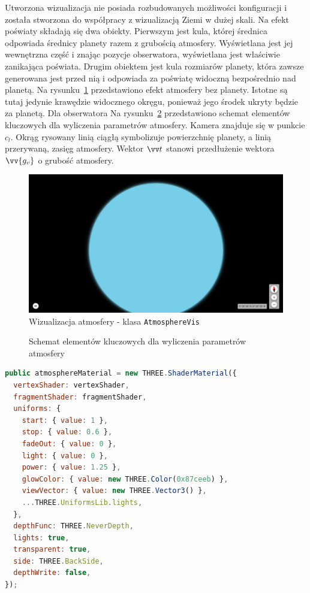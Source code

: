 Utworzona wizualizacja nie posiada rozbudowanych możliwości konfiguracji i została stworzona do współpracy z wizualizacją Ziemi w dużej skali. Na efekt poświaty składają się dwa obiekty. Pierwszym jest kula, której średnica odpowiada średnicy planety razem z grubością atmosfery. Wyświetlana jest jej wewnętrzna część i znając pozycje obserwatora, wyświetlana jest właściwie zanikająca poświata. Drugim obiektem jest kula rozmiarów planety, która zawsze generowana jest przed nią i odpowiada za poświatę widoczną bezpośrednio nad planetą. Na rysunku~\ref{fig:c4_atmosphereVis} przedstawiono efekt atmosfery bez planety. Istotne są tutaj jedynie krawędzie widocznego okręgu, ponieważ jego środek ukryty będzie za planetą. Dla obserwatora Na rysunku~\ref{fig:atmosphere} przedstawiono schemat elementów kluczowych dla wyliczenia parametrów atmosfery. Kamera znajduje się w punkcie $c_l$. Okrąg rysowany linią ciągłą symbolizuje powierzchnię planety, a linią przerywaną, zasięg atmosfery. Wektor $\vv t$ stanowi przedłużenie wektora $\vv{g_v}$ o grubość atmosfery.

\begin{figure}
  \centering
  \includegraphics[width=\linewidth]{img/c4_atmosphereVis.png}
  \caption{Wizualizacja atmosfery - klasa \texttt{AtmosphereVis}}
  \label{fig:c4_atmosphereVis} 
\end{figure}

\begin{figure}[h]
  \centering
  
  \caption{Schemat elementów kluczowych dla wyliczenia parametrów atmosfery}
  \label{fig:atmosphere}
\end{figure}

\begin{lstlisting}[float, language=javascript, label={lst:atmosphereVis}, caption={
  Fragmenty klasy \texttt{StarsVis}}
]
public atmosphereMaterial = new THREE.ShaderMaterial({
  vertexShader: vertexShader,
  fragmentShader: fragmentShader,
  uniforms: {
    start: { value: 1 },
    stop: { value: 0.6 },
    fadeOut: { value: 0 },
    light: { value: 0 },
    power: { value: 1.25 },
    glowColor: { value: new THREE.Color(0x87ceeb) },
    viewVector: { value: new THREE.Vector3() },
    ...THREE.UniformsLib.lights,
  },
  depthFunc: THREE.NeverDepth,
  lights: true,
  transparent: true,
  side: THREE.BackSide,
  depthWrite: false,
});
\end{lstlisting}

